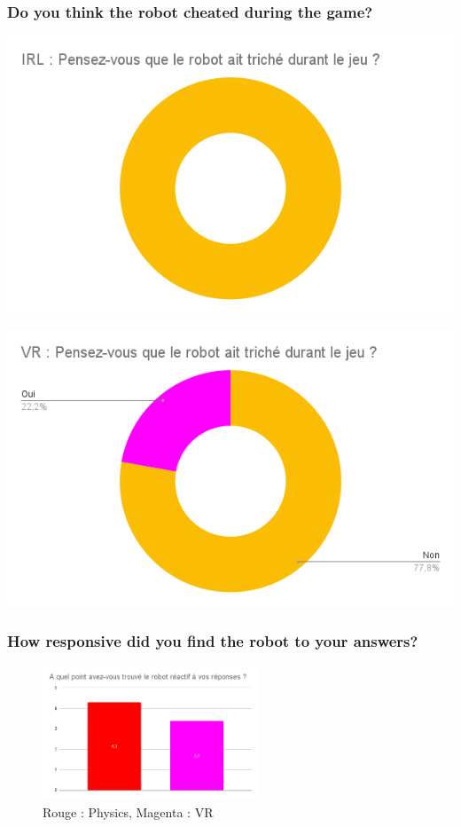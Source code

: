     \subsubsection{Do you think the robot cheated during the game?}
    \begin{minipage}{.5\textwidth}%
    \includegraphics[width=\textwidth]{Datas/IRLtriche.png}
    \end{minipage}%
    \begin{minipage}{.5\textwidth}%
    \includegraphics[width=\textwidth]{Datas/VR_triche.png}
    \end{minipage}%
    \vspace*{0.5cm}
    
    \subsubsection{How responsive did you find the robot to your answers?}
    \begin{figure}[!h]
    \centering
    \includegraphics[height=4cm]{Datas/robot_react_reponse.png}
    \caption{Rouge : Physics, Magenta : VR}
    \end{figure}
    \vspace*{0.5cm}

